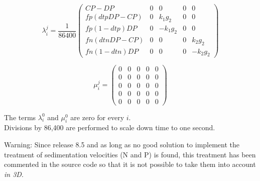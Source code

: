 \begin{equation}
\lambda_i^j = \frac{1}{86400}
\left(
  \begin{array}{ccccc}
    CP-DP & 0 & 0 & 0 & 0 \\ %
    fp (dtp DP -CP) & 0 &  k_1 g_2 & 0 & 0 \\ %
    fp (1-dtp) DP   & 0 & -k_1 g_2 & 0 & 0 \\ %
    fn (dtn DP -CP) & 0 &        0 & 0 &  k_2 g_2 \\ %
    fn (1-dtn) DP   & 0 &        0 & 0 & -k_2 g_2
  \end{array}
\right)
\end{equation}

$$
  \mu_i^j =
  \begin{pmatrix}
   0 & 0 & 0 & 0 & 0 \\
   0 & 0 & 0 & 0 & 0 \\
   0 & 0 & 0 & 0 & 0 \\
   0 & 0 & 0 & 0 & 0 \\
   0 & 0 & 0 & 0 & 0
  \end{pmatrix}
$$

The terms $\lambda_i^0$ and $\mu_i^0$ are zero for every $i$.\\

Divisions by 86,400 are performed to scale down time to one second.

\begin{WarningBlock}{Warning:}
Since release 8.5 and as long as no good solution to implement the treatment of
sedimentation velocities (N and P) is found, this treatment has been commented
in the source code so that it is not possible to take them into account
\emph{in 3D}.
\end{WarningBlock}
